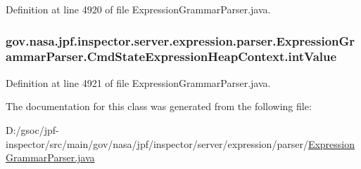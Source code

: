 Definition at line 4920 of file Expression\+Grammar\+Parser.\+java.

\subsubsection[{\texorpdfstring{int\+Value}{intValue}}]{ gov.\+nasa.\+jpf.\+inspector.\+server.\+expression.\+parser.\+Expression\+Grammar\+Parser.\+Cmd\+State\+Expression\+Heap\+Context.\+int\+Value}\hypertarget{classgov_1_1nasa_1_1jpf_1_1inspector_1_1server_1_1expression_1_1parser_1_1_expression_grammar_pa4cb3092c60a124c5db4482cce4b4fe10_a18f4b52f974507f15877ca98a03b8534}{}\label{classgov_1_1nasa_1_1jpf_1_1inspector_1_1server_1_1expression_1_1parser_1_1_expression_grammar_pa4cb3092c60a124c5db4482cce4b4fe10_a18f4b52f974507f15877ca98a03b8534}


Definition at line 4921 of file Expression\+Grammar\+Parser.\+java.



The documentation for this class was generated from the following file\+:\begin{DoxyCompactItemize}
\item 
D\+:/gsoc/jpf-\/inspector/src/main/gov/nasa/jpf/inspector/server/expression/parser/\hyperlink{_expression_grammar_parser_8java}{Expression\+Grammar\+Parser.\+java}\end{DoxyCompactItemize}
